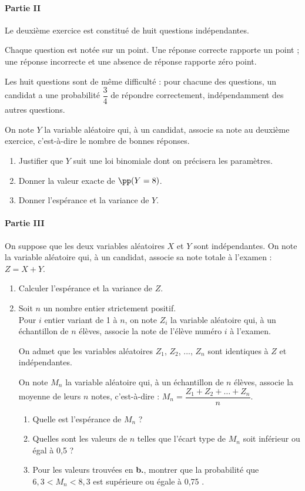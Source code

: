 \documentclass[11pt,fleqn, openany]{book} %
\begin{document}
\begin{exercise}[subtitle={(Sujet zéro 2024)}]
 \paragraph{Partie II}
 
Le deuxième exercice est constitué de huit questions indépendantes.

Chaque question est notée sur un point. Une réponse correcte rapporte un point ; une réponse incorrecte et une absence de réponse rapporte zéro point.

Les huit questions sont de même difficulté : pour chacune des questions, un candidat a une probabilité $\dfrac{3}{4}$ de répondre correctement, indépendamment des autres questions.

On note $Y$ la variable aléatoire qui, à un candidat, associe sa note au deuxième exercice, c'est-à-dire le nombre de bonnes réponses.

\begin{enumerate}
\item Justifier que $Y$ suit une loi binomiale dont on précisera les paramètres.
\item Donner la valeur exacte de $\pp(Y = 8)$.
\item Donner l'espérance et la variance de $Y$.
\end{enumerate}

\paragraph{Partie III}

On suppose que les deux variables aléatoires $X$ et $Y$ sont indépendantes. On note la variable aléatoire qui, à un candidat, associe sa note totale à l'examen : $Z = X +Y$.

\begin{enumerate}
\item Calculer l'espérance et la variance de $Z$.
\item Soit $n$ un nombre entier strictement positif.\\
Pour $i$ entier variant de 1 à $n$, on note $Z_i$ la variable aléatoire qui, à un échantillon de $n$ élèves, associe la note de l'élève numéro $i$ à l'examen.

On admet que les variables aléatoires $Z_1$, $Z_2$, ..., $Z_n$ sont identiques à $Z$ et indépendantes.

On note $M_n$  la variable aléatoire qui, à un échantillon de $n$ élèves, associe la moyenne de leurs $n$ notes, c'est-à-dire : $M_n=\dfrac{Z_1+Z_2+\ldots+Z_n}{n}$.
\vskip5pt
\begin{enumerate}
\item Quelle est l'espérance de $M_n$ ?
\item Quelles sont les valeurs de $n$ telles que l'écart type de $M_n$ soit inférieur ou égal à 0,5 ?
\item Pour les valeurs trouvées en \textbf{b.}, montrer que la probabilité que $6,3 < M_n < 8,3$ est supérieure ou égale à 0,75 .
\end{enumerate}
\end{enumerate}

\end{exercise}
\end{document}
